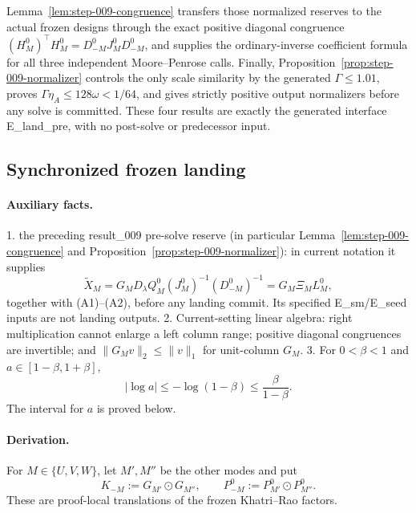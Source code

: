 Lemma~\ref{lem:step-009-congruence} transfers those normalized reserves to the
actual frozen designs through the exact positive diagonal congruence
\((H_M^0)^\top H_M^0=D_{-M}^0J_M^0D_{-M}^0\), and supplies the
ordinary-inverse coefficient formula for all three independent Moore--Penrose
calls. Finally, Proposition~\ref{prop:step-009-normalizer} controls the only
scale similarity by the generated \(\Gamma\le1.01\), proves
\(\Gamma\eta_A\le128\omega<1/64\), and gives strictly positive output
normalizers before any solve is committed. These four results are exactly
the generated interface E\_land\_pre, with no post-solve or predecessor input.

\subsection{Synchronized frozen landing}\label{app:step-010}

\paragraph{Auxiliary facts.}

1. the preceding result\_009 pre-solve reserve (in particular
   Lemma~\ref{lem:step-009-congruence} and
   Proposition~\ref{prop:step-009-normalizer}): in current notation it supplies
   \[
   \widetilde X_M
   =G_MD_\lambda Q_M^0(J_M^0)^{-1}(D_{-M}^0)^{-1}
   =G_M\Xi_ML_M^0, \tag{C1}
   \]
   together with (A1)--(A2), before any landing commit.  Its specified E\_sm/E\_seed inputs are not landing outputs.
2. Current-setting linear algebra: right multiplication cannot enlarge a
   left column range; positive diagonal congruences are invertible; and
   \(\|G_Mv\|_2\le\|v\|_1\) for unit-column \(G_M\).
3. For \(0<\beta<1\) and \(a\in[1-\beta,1+\beta]\),
   \[
   |\log a|\le-\log(1-\beta)\le\frac{\beta}{1-\beta}. \tag{C2}
   \]
   The interval for \(a\) is proved below.

\paragraph{Derivation.}

For \(M\in\{U,V,W\}\), let \(M',M''\) be the other modes and put
\[
K_{-M}:=G_{M'}\odot G_{M''},\qquad
P_{-M}^0:=P_{M'}^0\odot P_{M''}^0.
\]
These are proof-local translations of the frozen Khatri--Rao factors.


